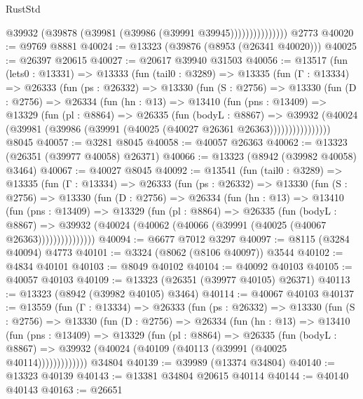 \begin{lexlean}{RustStd}
\begin{coremodule}
                        @39932 (@39878 (@39981 (@39986 (@39991 @39945)))))))))))))))
    @2773
@40020 := @9769 @8881
@40024 := @13323 (@39876 (@8953 (@26341 @40020)))
@40025 := @26397 @20615
@40027 := @20617 @39940 @31503
@40056 := @13517
    (fun (lets0 : @13331) =>
    @13333
      (fun (tail0 : @3289) =>
      @13335
        (fun (Γ : @13334) =>
        @26333
          (fun (ps : @26332) =>
          @13330
            (fun (S : @2756) =>
            @13330
              (fun (D : @2756) =>
              @26334
                (fun (hn : @13) =>
                @13410
                  (fun (pns : @13409) =>
                  @13329
                    (fun (pl : @8864) =>
                    @26335
                      (fun (bodyL : @8867) =>
                      @39932
                        (@40024
                          (@39981 (@39986 (@39991 (@40025 (@40027 @26361 @26363))))))))))))))))
    @8045
@40057 := @3281 @8045
@40058 := @40057 @26363
@40062 := @13323 (@26351 (@39977 @40058) @26371)
@40066 := @13323 (@8942 (@39982 @40058) @3464)
@40067 := @40027 @8045
@40092 := @13541
    (fun (tail0 : @3289) =>
    @13335
      (fun (Γ : @13334) =>
      @26333
        (fun (ps : @26332) =>
        @13330
          (fun (S : @2756) =>
          @13330
            (fun (D : @2756) =>
            @26334
              (fun (hn : @13) =>
              @13410
                (fun (pns : @13409) =>
                @13329
                  (fun (pl : @8864) =>
                  @26335
                    (fun (bodyL : @8867) =>
                    @39932 (@40024 (@40062 (@40066 (@39991 (@40025 (@40067 @26363)))))))))))))))
@40094 := @6677 @7012 @3297
@40097 := @8115 (@3284 @40094) @4773
@40101 := @3324 (@8062 (@8106 @40097)) @3544
@40102 := @4834 @40101
@40103 := @8049 @40102
@40104 := @40092 @40103
@40105 := @40057 @40103
@40109 := @13323 (@26351 (@39977 @40105) @26371)
@40113 := @13323 (@8942 (@39982 @40105) @3464)
@40114 := @40067 @40103
@40137 := @13559
    (fun (Γ : @13334) =>
    @26333
      (fun (ps : @26332) =>
      @13330
        (fun (S : @2756) =>
        @13330
          (fun (D : @2756) =>
          @26334
            (fun (hn : @13) =>
            @13410
              (fun (pns : @13409) =>
              @13329
                (fun (pl : @8864) =>
                @26335
                  (fun (bodyL : @8867) =>
                  @39932 (@40024 (@40109 (@40113 (@39991 (@40025 @40114)))))))))))))
    @34804
@40139 := @39989 (@13374 @34804)
@40140 := @13323 @40139
@40143 := @13381 @34804 @20615 @40114
@40144 := @40140 @40143
@40163 := @26651

\end{coremodule}
\end{lexlean}
